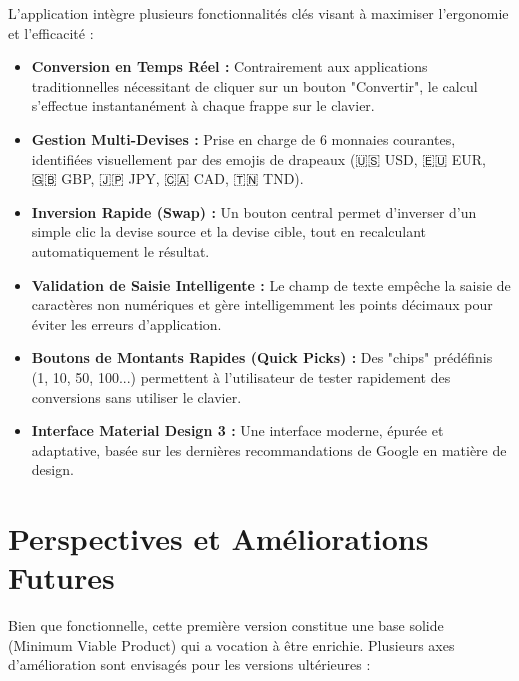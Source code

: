 \documentclass[12pt,a4paper]{article}
\begin{document}
L'application intègre plusieurs fonctionnalités clés visant à maximiser l'ergonomie et l'efficacité :

\begin{itemize}
    \item \textbf{Conversion en Temps Réel :} Contrairement aux applications traditionnelles nécessitant de cliquer sur un bouton "Convertir", le calcul s'effectue instantanément à chaque frappe sur le clavier.
    \item \textbf{Gestion Multi-Devises :} Prise en charge de 6 monnaies courantes, identifiées visuellement par des emojis de drapeaux (🇺🇸 USD, 🇪🇺 EUR, 🇬🇧 GBP, 🇯🇵 JPY, 🇨🇦 CAD, 🇹🇳 TND).
    \item \textbf{Inversion Rapide (Swap) :} Un bouton central permet d'inverser d'un simple clic la devise source et la devise cible, tout en recalculant automatiquement le résultat.
    \item \textbf{Validation de Saisie Intelligente :} Le champ de texte empêche la saisie de caractères non numériques et gère intelligemment les points décimaux pour éviter les erreurs d'application.
    \item \textbf{Boutons de Montants Rapides (Quick Picks) :} Des "chips" prédéfinis (1, 10, 50, 100...) permettent à l'utilisateur de tester rapidement des conversions sans utiliser le clavier.
    \item \textbf{Interface Material Design 3 :} Une interface moderne, épurée et adaptative, basée sur les dernières recommandations de Google en matière de design.
\end{itemize}

\section{Perspectives et Améliorations Futures}

Bien que fonctionnelle, cette première version constitue une base solide (Minimum Viable Product) qui a vocation à être enrichie. Plusieurs axes d'amélioration sont envisagés pour les versions ultérieures :
\end{document}
